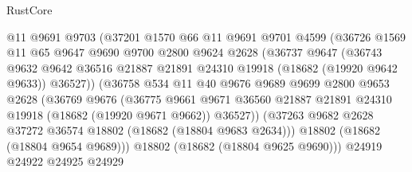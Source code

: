 \begin{lexlean}{RustCore}
\begin{coremodule}
                        @11
                        @9691
                        @9703
                        (@37201
                          @1570
                          @66
                          @11
                          @9691
                          @9701
                          @4599
                          (@36726
                            @1569
                            @11
                            @65
                            @9647
                            @9690
                            @9700
                            @2800
                            @9624
                            @2628
                            (@36737
                              @9647
                              (@36743
                                @9632
                                @9642
                                @36516
                                @21887
                                @21891
                                @24310
                                @19918
                                (@18682 (@19920 @9642 @9633))
                                @36527))
                            (@36758
                              @534
                              @11
                              @40
                              @9676
                              @9689
                              @9699
                              @2800
                              @9653
                              @2628
                              (@36769
                                @9676
                                (@36775
                                  @9661
                                  @9671
                                  @36560
                                  @21887
                                  @21891
                                  @24310
                                  @19918
                                  (@18682 (@19920 @9671 @9662))
                                  @36527))
                              (@37263
                                @9682
                                @2628
                                @37272
                                @36574
                                @18802
                                (@18682 (@18804 @9683 @2634)))
                              @18802
                              (@18682 (@18804 @9654 @9689)))
                            @18802
                            (@18682 (@18804 @9625 @9690)))
                          @24919
                          @24922
                          @24925
                          @24929

\end{coremodule}
\end{lexlean}
